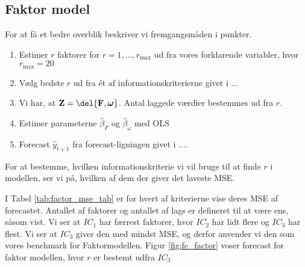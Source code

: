 \clearpage
\subsection{Faktor model}
For at få et bedre overblik beskriver vi fremgangsmåden i punkter. 
\begin{enumerate}
\item Estimer $r$ faktorer for $r = 1, \dots, r_{\max}$ ud fra vores forklarende variabler, hvor $r_{\max} = 20$  
\item Vælg bedste $r$ ud fra ét af informationskriterierne givet i ... 
\item Vi har, at $\textbf{Z} = \del{\textbf{F}, \boldsymbol{\omega}}$. Antal laggede værdier bestemmes ud fra $r$. 
\item Estimer parameterne $\widehat{\beta}_F$ og $\widehat{\beta}_\omega$ med OLS
\item Forecast $\widehat{y}_{t+1}$ fra forecast-ligningen givet i ....
\end{enumerate}
For at bestemme, hvilken informationskriterie vi vil bruge til at finde $r$ i modellen, ser vi på, hvilken af dem der giver det laveste MSE. 



I Tabel \ref{tab:factor_mse_tab} er for hvert af kriterierne vise deres MSE af forecastet.
Antallet af faktorer og antallet af lags er defineret til at være ens, såsom vist. Vi ser at $IC_1$ har færrest faktorer, hvor $IC_2$ har lidt flere og $IC_3$ har flest. 
Vi ser at $IC_3$ giver den med mindst MSE, og derfor anvender vi den som vores benchmark for Faktormodellen. 
Figur \ref{fig:fc_factor} voser forecast for faktor modellen, hvor $r$ er bestemt udfra $IC_3$







